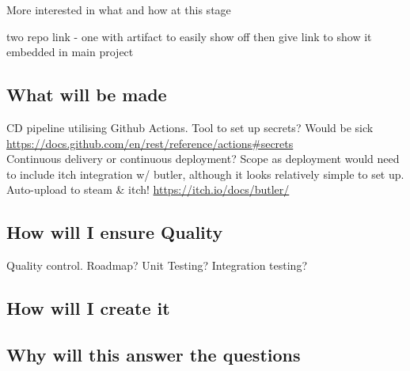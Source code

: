 \documentclass[lettersize,journal]{IEEEtran}
\begin{document}
    More interested in what and how at this stage

    two repo link - one with artifact to easily show off then give link to show it embedded in main project
    \subsection{What will be made}
        CD pipeline utilising Github Actions. Tool to set up secrets? Would be sick \url{https://docs.github.com/en/rest/reference/actions#secrets} \\
        Continuous delivery or continuous deployment? Scope as deployment would need to include itch integration w/ butler, although it looks relatively simple to set up.
        Auto-upload to steam \& itch! \url{https://itch.io/docs/butler/}

    \subsection{How will I ensure Quality}
        Quality control. Roadmap? Unit Testing? Integration testing?

    \subsection{How will I create it}

    \subsection{Why will this answer the questions}



\end{document}

